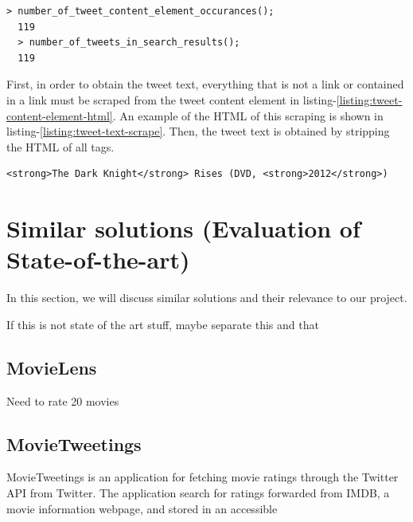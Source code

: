 \begin{lstlisting}[caption={Running functions in GCDT Javascript Console to show that the number of tweet content elements matches the number of tweets},label={listing:tweet-content-element-count-comparison},captionpos=b]
  > number_of_tweet_content_element_occurances();
  119
  > number_of_tweets_in_search_results();
  119
\end{lstlisting}

\noindent
First, in order to obtain the tweet text, everything that is not a link or contained in a link must be scraped from the tweet content element in listing-\ref{listing:tweet-content-element-html}. An example of the HTML of this scraping is shown in listing-\ref{listing:tweet-text-scrape}. Then, the tweet text is obtained by stripping the HTML of all tags.

\begin{lstlisting}[caption={The HTML of scraping everything from listing-\ref{listing:tweet-content-element-html} that is not a link},label={listing:tweet-text-scrape},captionpos=b]
  <strong>The Dark Knight</strong> Rises (DVD, <strong>2012</strong>)
\end{lstlisting}





\section{Similar solutions (Evaluation of State-of-the-art)}

In this section, we will discuss similar solutions and their relevance to our project.

If this is not state of the art stuff, maybe separate this and that


\subsection{MovieLens}\label{subsec:MovieLens}
Need to rate 20 movies

\subsection{MovieTweetings}
MovieTweetings is an application for fetching movie ratings through the Twitter API from Twitter. The application search for ratings forwarded from IMDB, a movie information webpage, and stored in an accessible

